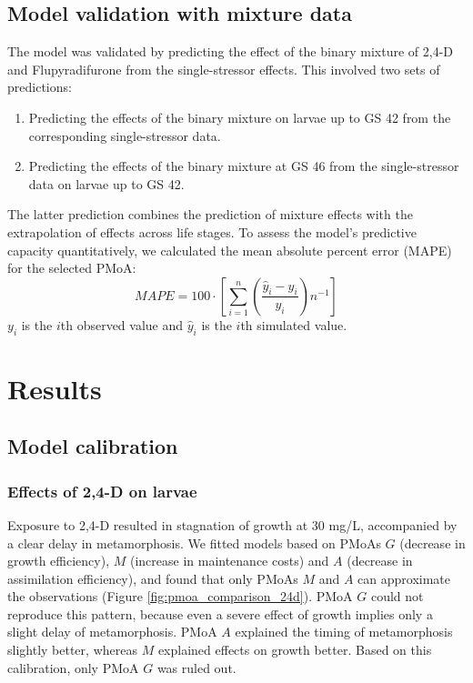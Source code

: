 \documentclass[utf8]{FrontiersinHarvard} %
\begin{document}
\subsection{Model validation with mixture data}
%
The model was validated by predicting the effect of the binary mixture of 2,4-D and Flupyradifurone from 
the single-stressor effects.
This involved two sets of predictions: 
\begin{enumerate}
    \item Predicting the effects of the binary mixture on larvae up to GS 42 from the corresponding single-stressor data.
    \item Predicting the effects of the binary mixture at GS 46 from the single-stressor data on larvae up to GS 42.
\end{enumerate}
%
The latter prediction combines the prediction of mixture effects with the extrapolation of effects across life stages.
%
To assess the model's predictive capacity quantitatively, we calculated the mean absolute percent error (MAPE) 
for the selected PMoA: 
\begin{equation}
    MAPE = 100 \cdot \left[ \sum\limits_{i=1}^{n} \left( \dfrac{\hat{y}_i - y_i}{y_i} \right) n^{-1}  \right]
    \label{eq:mape}
\end{equation}
%
$y_i$ is the $i$th observed value and $\hat{y}_i$ is the $i$th simulated value.

\section{Results}

\subsection{Model calibration}

\subsubsection{Effects of 2,4-D on larvae} 
%
Exposure to 2,4-D resulted in stagnation of growth at 30 mg/L, accompanied by a clear delay in metamorphosis. 
We fitted models based on PMoAs $G$ (decrease in growth efficiency), $M$ (increase in maintenance costs) and $A$ (decrease in assimilation efficiency), 
and found that only PMoAs $M$ and $A$ can approximate the observations (Figure \ref{fig:pmoa_comparison_24d}). 
PMoA $G$ could not reproduce this pattern, because even a severe effect of growth implies only a slight delay 
of metamorphosis. 
PMoA $A$ explained the timing of metamorphosis slightly better, whereas $M$ explained effects on growth better. 
Based on this calibration, only PMoA $G$ was ruled out.
\end{document}
